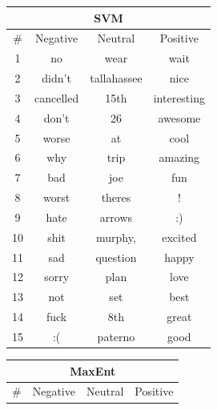\begin{table}[!htb]
	
	\begin{minipage}{.45\linewidth}
		\begin{tabular}{|c|c|c|c|}
		
		\multicolumn{4}{c}{SVM} \\ \hline
		
		\# & Negative & Neutral & Positive \\ \hline\hline
		
		1 & no  		& wear & wait \\ \hline
		2 & didn't  	& tallahassee & nice \\ \hline
		3 & cancelled  	& 15th & interesting \\ \hline
		4 & don't  		& 26 & awesome \\ \hline
		5 & worse  		& at & cool \\ \hline
		6 & why  		& trip & amazing \\ \hline
		7 & bad  		& joe & fun \\ \hline
		8 & worst  		& theres & ! \\ \hline
		9 & hate  		& arrows & :) \\ \hline
		10 & shit  		& murphy, & excited \\ \hline
		11 & sad  		& question & happy \\ \hline
		12 & sorry  		& plan & love \\ \hline
		13 & not  		& set & best \\ \hline
		14 & fuck  		& 8th & great \\ \hline
		15 & :(  		& paterno & good \\ \hline
		\end{tabular}
	\end{minipage}
	\hspace{0.05\linewidth}
	\begin{minipage}{.45\linewidth}
		\begin{tabular}{|c|c|c|c|}		
		\multicolumn{4}{c}{MaxEnt} \\ \hline
		
		\# & Negative & Neutral & Positive \\ \hline\hline
		

\end{tabular}
\end{minipage}
\end{table}
